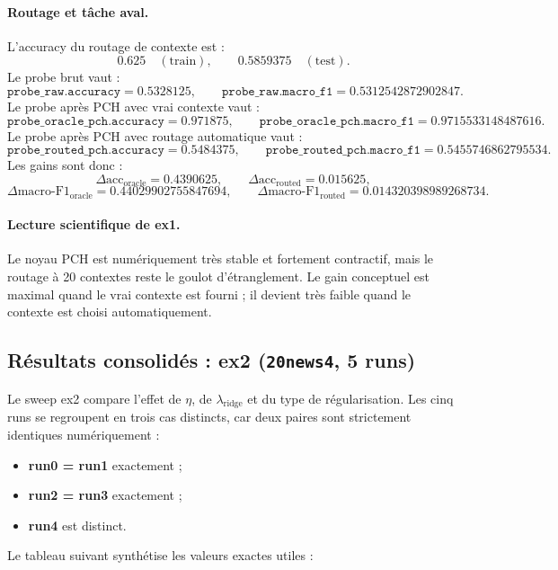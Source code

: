 \paragraph{Routage et tâche aval.}
L’accuracy du routage de contexte est :
\[
0.625\quad(\text{train}),\qquad 0.5859375\quad(\text{test}).
\]
Le probe brut vaut :
\[
\texttt{probe\_raw.accuracy}=0.5328125,
\qquad
\texttt{probe\_raw.macro\_f1}=0.5312542872902847.
\]
Le probe après PCH avec vrai contexte vaut :
\[
\texttt{probe\_oracle\_pch.accuracy}=0.971875,
\qquad
\texttt{probe\_oracle\_pch.macro\_f1}=0.9715533148487616.
\]
Le probe après PCH avec routage automatique vaut :
\[
\texttt{probe\_routed\_pch.accuracy}=0.5484375,
\qquad
\texttt{probe\_routed\_pch.macro\_f1}=0.5455746862795534.
\]
Les gains sont donc :
\[
\Delta\text{acc}_{\text{oracle}}=0.4390625,
\qquad
\Delta\text{acc}_{\text{routed}}=0.015625,
\]
\[
\Delta\text{macro-F1}_{\text{oracle}}=0.44029902755847694,
\qquad
\Delta\text{macro-F1}_{\text{routed}}=0.014320398989268734.
\]

\paragraph{Lecture scientifique de ex1.}
Le noyau PCH est numériquement très stable et fortement contractif, mais le routage à 20 contextes reste le goulot d’étranglement. Le gain conceptuel est maximal quand le vrai contexte est fourni ; il devient très faible quand le contexte est choisi automatiquement.

\subsection{Résultats consolidés : ex2 (\texttt{20news4}, 5 runs)}

Le sweep ex2 compare l’effet de \(\eta\), de \(\lambda_{\mathrm{ridge}}\) et du type de régularisation. Les cinq runs se regroupent en trois cas distincts, car deux paires sont strictement identiques numériquement :

\begin{itemize}
    \item \textbf{run0 = run1} exactement ;
    \item \textbf{run2 = run3} exactement ;
    \item \textbf{run4} est distinct.
\end{itemize}

Le tableau suivant synthétise les valeurs exactes utiles :

